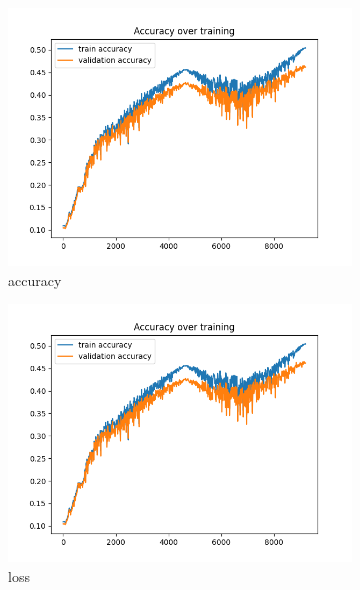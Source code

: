 \documentclass[a4paper]{article}
\begin{document}
\begin{figure}[h]
	\centering
	\begin{subfigure}{0.3\textwidth}
		\centering
		\includegraphics[width=\linewidth]{images/ex2_9layer_no_batch_acc.png}
		\caption{accuracy}
	\end{subfigure}
	\begin{subfigure}{0.3\textwidth}
		\centering
		\includegraphics[width=\linewidth]{images/ex2_9layer_no_batch_acc.png}
		\caption{loss}
	\end{subfigure}
	\begin{subfigure}{0.3\textwidth}
		\centering

\end{subfigure}
\end{figure}
\end{document}

